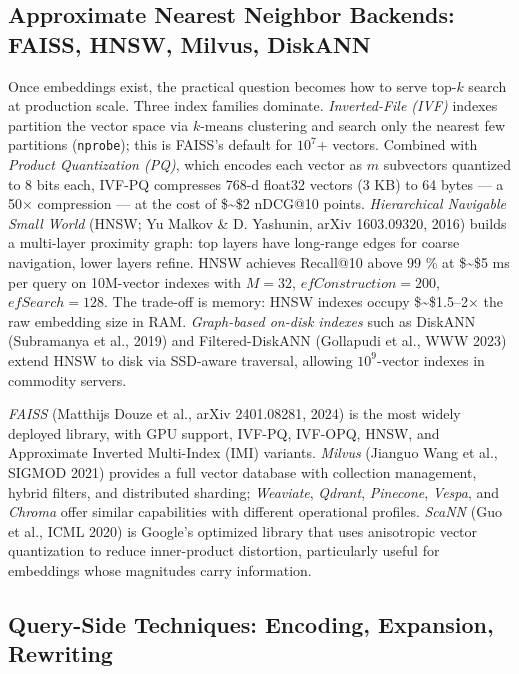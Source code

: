 \subsection{Approximate Nearest Neighbor Backends: FAISS, HNSW, Milvus, DiskANN}\label{approximate-nearest-neighbor-backends-faiss-hnsw-milvus-diskann}

Once embeddings exist, the practical question becomes how to serve top-\(k\) search at production scale. Three index families dominate. \emph{Inverted-File (IVF)} indexes partition the vector space via \(k\)-means clustering and search only the nearest few partitions (\texttt{nprobe}); this is FAISS's default for \(10^7\)+ vectors. Combined with \emph{Product Quantization (PQ)}, which encodes each vector as \(m\) subvectors quantized to 8 bits each, IVF-PQ compresses 768-d float32 vectors (3 KB) to 64 bytes --- a 50× compression --- at the cost of \$\sim\$2 nDCG@10 points. \emph{Hierarchical Navigable Small World} (HNSW; Yu Malkov \& D. Yashunin, arXiv 1603.09320, 2016) builds a multi-layer proximity graph: top layers have long-range edges for coarse navigation, lower layers refine. HNSW achieves Recall@10 above 99 \% at \$\sim\$5 ms per query on 10M-vector indexes with \(M=32\), \(efConstruction=200\), \(efSearch=128\). The trade-off is memory: HNSW indexes occupy \$\sim\$1.5--2× the raw embedding size in RAM. \emph{Graph-based on-disk indexes} such as DiskANN (Subramanya et al., 2019) and Filtered-DiskANN (Gollapudi et al., WWW 2023) extend HNSW to disk via SSD-aware traversal, allowing \(10^9\)-vector indexes in commodity servers.

\emph{FAISS} (Matthijs Douze et al., arXiv 2401.08281, 2024) is the most widely deployed library, with GPU support, IVF-PQ, IVF-OPQ, HNSW, and Approximate Inverted Multi-Index (IMI) variants. \emph{Milvus} (Jianguo Wang et al., SIGMOD 2021) provides a full vector database with collection management, hybrid filters, and distributed sharding; \emph{Weaviate}, \emph{Qdrant}, \emph{Pinecone}, \emph{Vespa}, and \emph{Chroma} offer similar capabilities with different operational profiles. \emph{ScaNN} (Guo et al., ICML 2020) is Google's optimized library that uses anisotropic vector quantization to reduce inner-product distortion, particularly useful for embeddings whose magnitudes carry information.

\subsection{Query-Side Techniques: Encoding, Expansion, Rewriting}\label{query-side-techniques-encoding-expansion-rewriting}

